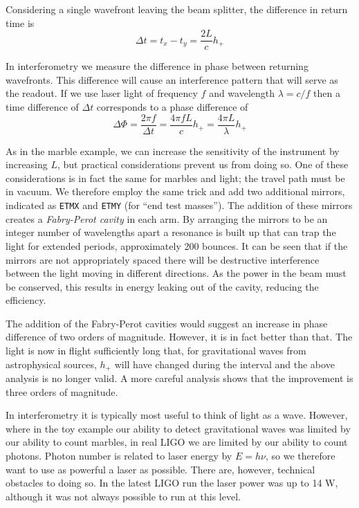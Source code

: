 Considering a single wavefront leaving the beam splitter, the
difference in return time is
%
\begin{equation*}
\Delta t = t_x - t_y = \frac{2L}{c} h_+
\end{equation*}

In interferometry we measure the difference in phase between returning
wavefronts.  This difference will cause an interference pattern that
will serve as the readout.  If we use laser light of frequency $f$ and
wavelength $\lambda = c/f$ then a time difference of $\Delta t$
corresponds to a phase difference of 
%
\begin{equation*}
\Delta \Phi = \frac{2\pi f}{\Delta t} = \frac{4\pi f L}{c} h_+
= \frac{4\pi L}{\lambda} h_+
\end{equation*}

As in the marble example, we can increase the sensitivity of the
instrument by increasing $L$, but practical considerations prevent us
from doing so.  One of these considerations is in fact the same for
marbles and light; the travel path must be in vacuum.  We
therefore employ the same trick and add two additional mirrors,
indicated as \texttt{ETMX} and \texttt{ETMY} (for ``end test
masses'').  The addition of these mirrors creates a \emph{Fabry-Perot
cavity} in each arm.  By arranging the mirrors to be an integer
number of wavelengths apart a resonance is built up that can trap the
light for extended periods, approximately 200 bounces.  It can be seen
that if the mirrors are not appropriately spaced there will be
destructive interference between the light moving in different
directions.  As the power in the beam must be conserved, this results
in energy leaking out of the cavity, reducing the efficiency.

The addition of the Fabry-Perot cavities would suggest an increase in
phase difference of two orders of magnitude.  However, it is in fact
better than that.  The light is now in flight sufficiently long that,
for gravitational waves from astrophysical sources, $h_+$ will have
changed during the interval and the above analysis is no longer
valid.  A more careful analysis shows that the improvement is 
three orders of magnitude.

In interferometry it is typically most useful to think of light as a
wave.  However, where in the toy example our ability to detect
gravitational waves was limited by our ability to count marbles, in
real LIGO we are limited by our ability to count photons.  Photon
number is related to laser energy by $E=h\nu$, so we therefore want to
use as powerful a laser as possible.  There are, however, technical
obstacles to doing so.  In the latest LIGO run the laser power was up
to 14 W, although it was not always possible to run at this level.

